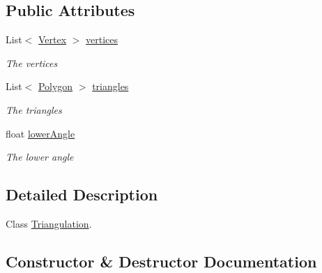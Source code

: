 \subsection*{Public Attributes}
\begin{DoxyCompactItemize}
\item 
List$<$ \hyperlink{class_lerp2_a_p_i_1_1_utility_1_1_c_s_g_1_1_triangulation_1_1_vertex}{Vertex} $>$ \hyperlink{class_lerp2_a_p_i_1_1_utility_1_1_c_s_g_1_1_triangulation_adcd2220db9df1a641a9504be92211497}{vertices}
\begin{DoxyCompactList}\small\item\em The vertices \end{DoxyCompactList}\item 
List$<$ \hyperlink{class_lerp2_a_p_i_1_1_utility_1_1_c_s_g_1_1_triangulation_1_1_polygon}{Polygon} $>$ \hyperlink{class_lerp2_a_p_i_1_1_utility_1_1_c_s_g_1_1_triangulation_a33bbce81760bb6cd84651088fa09b1d7}{triangles}
\begin{DoxyCompactList}\small\item\em The triangles \end{DoxyCompactList}\item 
float \hyperlink{class_lerp2_a_p_i_1_1_utility_1_1_c_s_g_1_1_triangulation_a4599412105f23349ce6c081c0916d8e5}{lower\+Angle}
\begin{DoxyCompactList}\small\item\em The lower angle \end{DoxyCompactList}\end{DoxyCompactItemize}


\subsection{Detailed Description}
Class \hyperlink{class_lerp2_a_p_i_1_1_utility_1_1_c_s_g_1_1_triangulation}{Triangulation}. 



\subsection{Constructor \& Destructor Documentation}
\mbox{\label{class_lerp2_a_p_i_1_1_utility_1_1_c_s_g_1_1_triangulation_ae95f3bccaee928c0998daf4c48144f6d}} 
